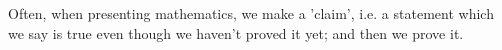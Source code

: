 Often, when presenting mathematics, we make a 'claim',
i.e. a statement which we say is true even though we
haven't proved it yet; and then we prove it.
